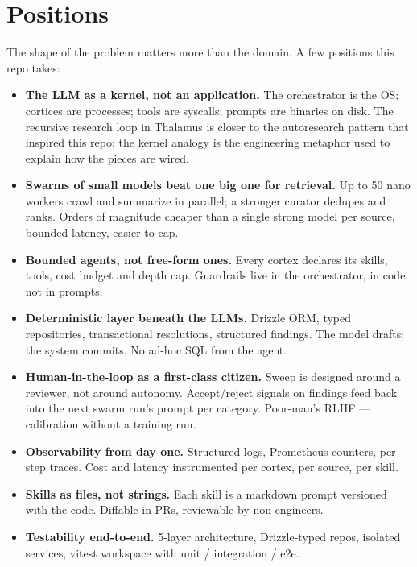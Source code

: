 




\makespecheader

\section{Positions}

The shape of the problem matters more than the domain. A few positions this repo takes:

\begin{itemize}[leftmargin=1.2em]
  \item \textbf{The LLM as a kernel, not an application.} The orchestrator is the OS; cortices are processes; tools are syscalls; prompts are binaries on disk. The recursive research loop in Thalamus is closer to the autoresearch pattern that inspired this repo; the kernel analogy is the engineering metaphor used to explain how the pieces are wired.
  \item \textbf{Swarms of small models beat one big one for retrieval.} Up to 50 nano workers crawl and summarize in parallel; a stronger curator dedupes and ranks. Orders of magnitude cheaper than a single strong model per source, bounded latency, easier to cap.
  \item \textbf{Bounded agents, not free-form ones.} Every cortex declares its skills, tools, cost budget and depth cap. Guardrails live in the orchestrator, in code, not in prompts.
  \item \textbf{Deterministic layer beneath the LLMs.} Drizzle ORM, typed repositories, transactional resolutions, structured findings. The model drafts; the system commits. No ad-hoc SQL from the agent.
  \item \textbf{Human-in-the-loop as a first-class citizen.} Sweep is designed around a reviewer, not around autonomy. Accept/reject signals on findings feed back into the next swarm run's prompt per category. Poor-man's RLHF --- calibration without a training run.
  \item \textbf{Observability from day one.} Structured logs, Prometheus counters, per-step traces. Cost and latency instrumented per cortex, per source, per skill.
  \item \textbf{Skills as files, not strings.} Each skill is a markdown prompt versioned with the code. Diffable in PRs, reviewable by non-engineers.
  \item \textbf{Testability end-to-end.} 5-layer architecture, Drizzle-typed repos, isolated services, vitest workspace with unit / integration / e2e.
\end{itemize}


